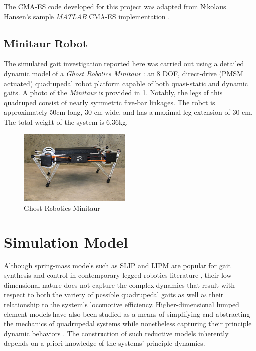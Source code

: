 \documentclass[conference,11pt,letterpaper]{IEEEtran}
\begin{document}
The CMA-ES code developed for this project was adapted from Nikolaus Hansen's sample \emph{MATLAB} CMA-ES implementation \autocite{Hansen2011}. 


\subsection{Minitaur Robot}

The simulated gait investigation reported here was carried out using a detailed dynamic model of a \emph{Ghost Robotics Minitaur} \autocite{grminitaur}: an 8 DOF, direct-drive (PMSM actuated) quadrupedal robot platform capable of both quasi-static and dynamic gaits. A photo of the \emph{Minitaur} is provided in \cref{fig:grminitaur}. Notably, the legs of this quadruped consist of nearly symmetric five-bar linkages. The robot is approximately 50\si{\centi\m} long, 30 \si{\centi\m} wide, and has a maximal leg extension of 30 \si{\centi\m}. The total weight of the system is 6.36\si{\kg}.

\begin{figure}[ht!]
    \centering
    \includegraphics[width=0.48\textwidth]{grminitaur}
    \caption{Ghost Robotics Minitaur \autocite{grminitaur}}
    \label{fig:grminitaur}
\end{figure}

\section{Simulation Model}

Although spring-mass models such as SLIP and LIPM are popular for gait synthesis and control in contemporary legged robotics literature \autocite{albertwuhartmutgeyer2013}, their low-dimensional nature does not capture the complex dynamics that result with respect to both the variety of possible quadrupedal gaits as well as their relationship to the system's locomotive efficiency. Higher-dimensional lumped element models have also been studied as a means of simplifying and abstracting the mechanics of quadrupedal systems while nonetheless capturing their principle dynamic behaviors \autocite{remy2011optimal,full1999templates}. The construction of such reductive models inherently depends on a-priori knowledge of the systems' principle dynamics.
\end{document}
